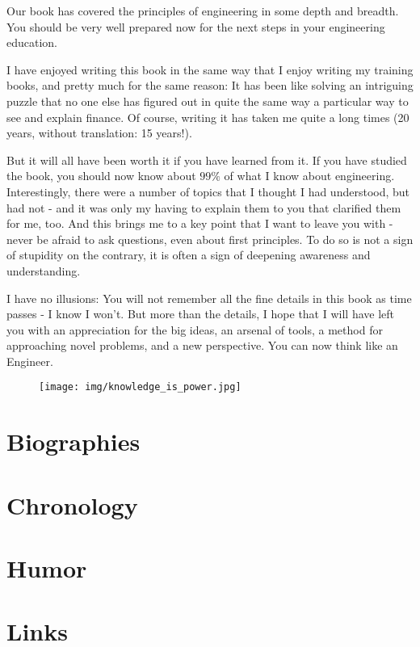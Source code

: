 \documentclass[12pt,a4paper,twoside,openright]{report}
\theoremstyle{definition}
\theoremstyle{itexmp}
\numberwithin{equation}{section}
\begin{document}
	Our book has covered the principles of engineering in some depth and breadth. You should be very well prepared now for the next steps in your engineering education.
	
	I have enjoyed writing this book in the same way that I enjoy writing my training books, and pretty much for the same reason: It has been like solving an intriguing puzzle that no one else has figured out in quite the same way a particular way to see and explain finance. Of course, writing it has taken me quite a long times (20 years, without translation: 15 years!).
	
	But it will all have been worth it if you have learned from it. If you have studied the book, you should now know about $99\%$ of what I know about engineering. Interestingly, there were a number of topics that I thought I had understood, but had not - and it was only my having to explain them to you that clarified them for me, too. And this brings me to a key point that I want to leave you with - never be afraid to ask questions, even about first principles. To do so is not a sign of stupidity on the contrary, it is often a sign of deepening awareness and understanding.

	I have no illusions: You will not remember all the fine details in this book as time passes - I know I won't. But more than the details, I hope that I will have left you with an appreciation for the big ideas, an arsenal of tools, a method for approaching novel problems, and a new perspective. You can now think like an Engineer. 
	\begin{figure}[H]
		\centering
		\texttt{[image: img/knowledge\_is\_power.jpg]}	
	\end{figure}
	
	\chapter{Biographies}
	

	\chapter{Chronology}
	

	\chapter{Humor}
	\minitoc
	\pagebreak
	

 	\chapter{Links}
	
\end{document}
